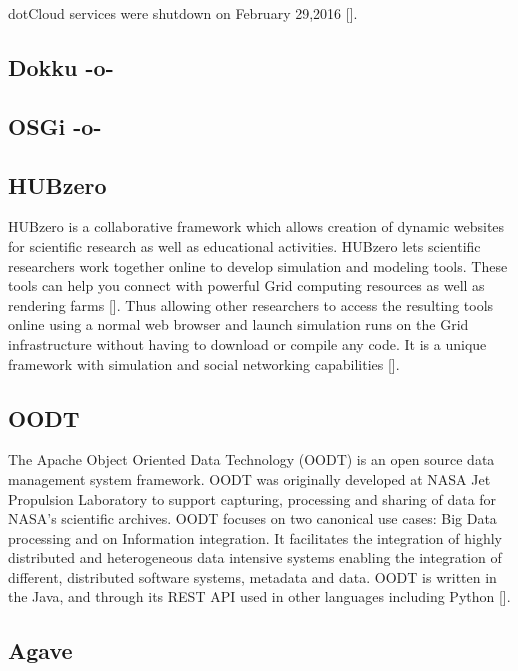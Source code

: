 dotCloud services were shutdown on February
29,2016 [\cite{www-dotCloud}].


    

\subsection{Dokku -o-}



\subsection{OSGi -o-}



\subsection{HUBzero}
     
HUBzero is a collaborative framework which allows creation of dynamic
websites for scientific research as well as educational activities.
HUBzero lets scientific researchers work together online to develop
simulation and modeling tools.  These tools can help you connect with
powerful Grid computing resources as well as rendering
farms [\cite{hubzerowebsite}]. Thus allowing other researchers to access
the resulting tools online using a normal web browser and launch
simulation runs on the Grid infrastructure without having to download
or compile any code. It is a unique framework with simulation and
social networking capabilities [\cite{hubzeropaper2010}].

\subsection{OODT}
     
The Apache Object Oriented Data Technology (OODT) is an open source
data management system framework. OODT was originally developed at
NASA Jet Propulsion Laboratory to support capturing, processing and
sharing of data for NASA's scientific archives. OODT focuses on two
canonical use cases: Big Data processing and on Information
integration. It facilitates the integration of highly distributed and
heterogeneous data intensive systems enabling the integration of
different, distributed software systems, metadata and data. OODT is
written in the Java, and through its REST API used in other languages
including Python [\cite{www-oodt2}].
     
\subsection{Agave}

